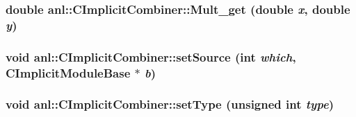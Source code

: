 \label{classanl_1_1CImplicitCombiner_ae2e84d5ea862a45c0512ee86f51e9ead}
\hypertarget{classanl_1_1CImplicitCombiner_adc188109266c7c9efe97615eec938faf}{
\subsubsection[{Mult\_\-get}]{\setlength{\rightskip}{0pt plus 5cm}double anl::CImplicitCombiner::Mult\_\-get (double {\em x}, \/  double {\em y})}}
\label{classanl_1_1CImplicitCombiner_adc188109266c7c9efe97615eec938faf}
\hypertarget{classanl_1_1CImplicitCombiner_a6b34ce5f8ace58ad566d5d5314c2dd0c}{
\subsubsection[{setSource}]{\setlength{\rightskip}{0pt plus 5cm}void anl::CImplicitCombiner::setSource (int {\em which}, \/  {\bf CImplicitModuleBase} $\ast$ {\em b})}}
\label{classanl_1_1CImplicitCombiner_a6b34ce5f8ace58ad566d5d5314c2dd0c}
\hypertarget{classanl_1_1CImplicitCombiner_a52cc9cc6c8b21f529ededdde2b160f68}{
\subsubsection[{setType}]{\setlength{\rightskip}{0pt plus 5cm}void anl::CImplicitCombiner::setType (unsigned int {\em type})}}
\label{classanl_1_1CImplicitCombiner_a52cc9cc6c8b21f529ededdde2b160f68}


